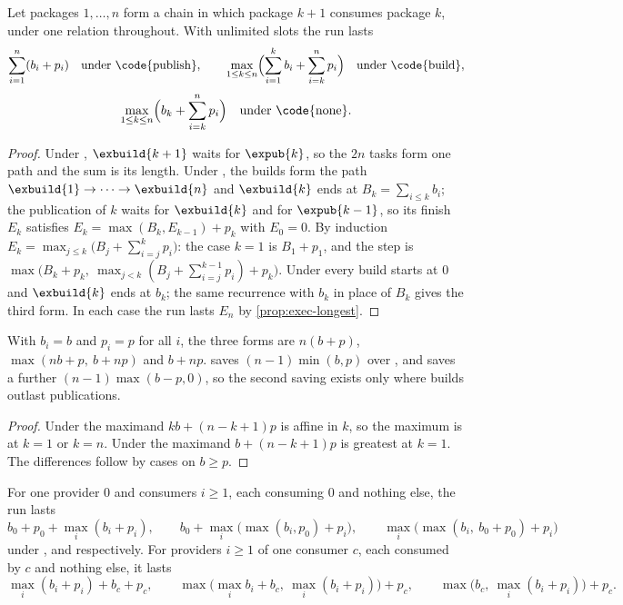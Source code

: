 \begin{proposition}
\label{prop:exec-chain}
Let packages $1, \dots, n$ form a chain in which package $k+1$ consumes package
$k$, under one relation throughout. With unlimited slots the run lasts
\[
  \sum_{i=1}^{n} (b_i + p_i) \quad\text{under \code{publish}},\qquad
  \max_{1 \le k \le n}\Bigl(\sum_{i=1}^{k} b_i + \sum_{i=k}^{n} p_i\Bigr)
  \quad\text{under \code{build}},
\]
\[
  \max_{1 \le k \le n}\Bigl(b_k + \sum_{i=k}^{n} p_i\Bigr)
  \quad\text{under \code{none}}.
\]
\end{proposition}

\begin{proof}
Under , $\exbuild{k+1}$ waits for $\expub{k}$, so the $2n$ tasks
form one path and the sum is its length. Under , the builds form
the path $\exbuild{1} \to \dots \to \exbuild{n}$ and $\exbuild{k}$ ends at
$B_k = \sum_{i \le k} b_i$; the publication of $k$ waits for $\exbuild{k}$ and
for $\expub{k-1}$, so its finish $E_k$ satisfies $E_k = \max(B_k, E_{k-1}) +
p_k$ with $E_0 = 0$. By induction $E_k = \max_{j \le k}\bigl(B_j +
\sum_{i=j}^{k} p_i\bigr)$: the case $k = 1$ is $B_1 + p_1$, and the step is
$\max\bigl(B_k + p_k,\ \max_{j < k}(B_j + \sum_{i=j}^{k-1} p_i) + p_k\bigr)$.
Under  every build starts at $0$ and $\exbuild{k}$ ends at $b_k$;
the same recurrence with $b_k$ in place of $B_k$ gives the third form. In each
case the run lasts $E_n$ by \cref{prop:exec-longest}.
\end{proof}

\begin{corollary}
\label{cor:exec-equal}
With $b_i = b$ and $p_i = p$ for all $i$, the three forms are $n(b+p)$,
$\max(nb + p,\ b + np)$ and $b + np$.  saves $(n-1)\min(b,p)$
over , and  saves a further $(n-1)\max(b-p, 0)$, so
the second saving exists only where builds outlast publications.
\end{corollary}

\begin{proof}
Under  the maximand $kb + (n-k+1)p$ is affine in $k$, so the
maximum is at $k = 1$ or $k = n$. Under  the maximand $b + (n-k+1)p$
is greatest at $k = 1$. The differences follow by cases on $b \ge p$.
\end{proof}

\begin{proposition}
\label{prop:exec-fan}
For one provider $0$ and consumers $i \ge 1$, each consuming $0$ and nothing
else, the run lasts
\[
  b_0 + p_0 + \max_i (b_i + p_i),\qquad
  b_0 + \max_i\bigl(\max(b_i, p_0) + p_i\bigr),\qquad
  \max_i\bigl(\max(b_i,\ b_0 + p_0) + p_i\bigr)
\]
under ,  and  respectively. For providers
$i \ge 1$ of one consumer $c$, each consumed by $c$ and nothing else, it lasts
\[
  \max_i (b_i + p_i) + b_c + p_c,\qquad
  \max\bigl(\max_i b_i + b_c,\ \max_i (b_i + p_i)\bigr) + p_c,\qquad
  \max\bigl(b_c,\ \max_i (b_i + p_i)\bigr) + p_c.
\]
\end{proposition}

